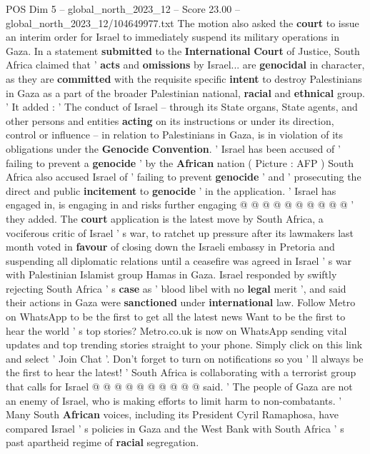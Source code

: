 \begin{textsample}{POS Dim 5 – global\_north\_2023\_12 – Score 23.00 – global\_north\_2023\_12/104649977.txt}  \label{ex:f5_pos_391}
The motion also asked the \textbf{court} to issue an interim order for Israel to immediately suspend its military operations in Gaza.
In a statement \textbf{submitted} to the \textbf{International} \textbf{Court} of Justice, South Africa claimed that ' \textbf{acts} and \textbf{omissions} by Israel... are \textbf{genocidal} in character, as they are \textbf{committed} with the requisite specific \textbf{intent} to destroy Palestinians in Gaza as a part of the broader Palestinian national, \textbf{racial} and \textbf{ethnical} group. ' It added : ' The conduct of Israel -- through its State organs, State agents, and other persons and entities \textbf{acting} on its instructions or under its direction, control or influence -- in relation to Palestinians in Gaza, is in violation of its obligations under the \textbf{Genocide} \textbf{Convention}. ' Israel has been accused of ' failing to prevent a \textbf{genocide} ' by the \textbf{African} nation ( Picture : AFP ) South Africa also accused Israel of ' failing to prevent \textbf{genocide} ' and ' prosecuting the direct and public \textbf{incitement} to \textbf{genocide} ' in the application. ' Israel has engaged in, is engaging in and risks further engaging @ @ @ @ @ @ @ @ @ @ ' they added.
The \textbf{court} application is the latest move by South Africa, a vociferous critic of Israel ' s war, to ratchet up pressure after its lawmakers last month voted in \textbf{favour} of closing down the Israeli embassy in Pretoria and suspending all diplomatic relations until a ceasefire was agreed in Israel ' s war with Palestinian Islamist group Hamas in Gaza.
Israel responded by swiftly rejecting South Africa ' s \textbf{case} as ' blood libel with no \textbf{legal} merit ', and said their actions in Gaza were \textbf{sanctioned} under \textbf{international} law.
Follow Metro on WhatsApp to be the first to get all the latest news Want to be the first to hear the world ' s top stories?
Metro.co.uk is now on WhatsApp sending vital updates and top trending stories straight to your phone.
Simply click on this link and select ' Join Chat '.
Don't forget to turn on notifications so you ' ll always be the first to hear the latest! ' South Africa is collaborating with a terrorist group that calls for Israel @ @ @ @ @ @ @ @ @ @ said. ' The people of Gaza are not an enemy of Israel, who is making efforts to limit harm to non-combatants. ' Many South \textbf{African} voices, including its President Cyril Ramaphosa, have compared Israel ' s policies in Gaza and the West Bank with South Africa ' s past apartheid regime of \textbf{racial} segregation.

\end{textsample}
